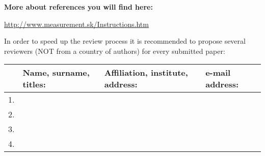 \documentclass[english]{MSRarticle}
\begin{document}



\begin{table*}
	\begin{center}
	\textbf{More about references you will find here:}

 \url{http://www.measurement.sk/Instructions.htm}

	{In order to speed up the review process it is recommended to propose several reviewers (NOT from a country of authors) for every submitted paper:}\\
		
	\begin{tabular*}{\textwidth}{ | p{1cm} |p{5cm}| p{5cm}| p{5cm} | }
		\hline
	   & Name, surname, titles:  &  Affiliation, institute, address: &   e-mail address: \\\hline 
  1. &  &   &   \\\hline 
	2. &  &   &   \\\hline 
	3. &  &   &   \\\hline 
	4. &  &   &   \\\hline 
	\end{tabular*}
	\end{center}
\end{table*}
\end{document}
